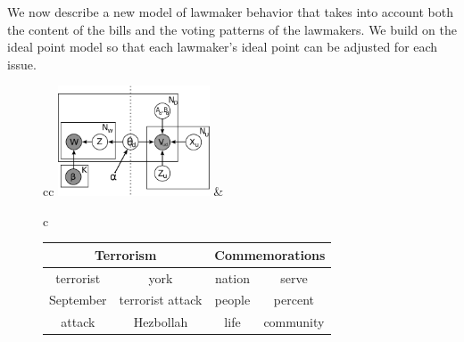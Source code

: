 We now describe a new model of lawmaker behavior that takes into
account both the content of the bills and the voting patterns of the
lawmakers.  We build on the ideal point model so that
each lawmaker's ideal point can be adjusted for each issue.

\begin{figure}
  \center
  \begin{tabular}{cc}
    \includegraphics[width=0.4\textwidth]{chapter_spatial_voting_with_text/figures/legis_gm.pdf} &
    \small
 \begin{tabular}{c}
 \begin{tabular}{|cc|cc|}
    \hline
    \multicolumn{2}{|c|}{\textbf{Terrorism}} & \multicolumn{2}{|c|}{\textbf{Commemorations}} \\
    \hline
    terrorist & york & nation & serve \\
    September & terrorist attack & people & percent \\
    attack & Hezbollah & life & community \\

\end{tabular}
\end{tabular}
\end{tabular}
\end{figure}
